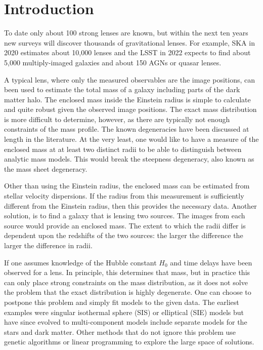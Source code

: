 \documentclass[onecolumn,galley]{mn2e}
\begin{document}
\section{Introduction}

To date only about 100 strong lenses are known, but within the next ten years
new surveys will discover thousands of gravitational lenses. For example, SKA
in 2020 estimates about 10,000 lenses and the LSST in 2022 expects to find
about 5,000 multiply-imaged galaxies and about 150 AGNs or quasar lenses.

A typical lens, where only the measured observables are the image positions,
can been used to estimate the total mass of a galaxy including parts of the
dark matter halo. The enclosed mass inside the Einstein radius is simple to
calculate and quite robust given the observed image positions. The exact mass
distribution is more difficult to determine, however, as there are typically
not enough constraints of the mass profile. The known degeneracies have been
discussed at length in the literature. At the very least, one would like to
have a measure of the enclosed mass at at least two distinct radii to be able
to distinguish between analytic mass models. This would break the steepness
degeneracy, also known as the mass sheet degeneracy.

Other than using the Einstein radius, the enclosed mass can be estimated
from stellar velocity dispersions. If the radius from this measurement
is sufficiently different from the Einstein radius, then this provides the
necessary data. Another solution, is to find a galaxy that is lensing two
sources. The images from each source would provide an enclosed mass. The
extent to which the radii differ is dependent upon the redshifts of the
two sources: the larger the difference the larger the difference in radii.

If one assumes knowledge of the Hubble constant $H_0$ and time delays have been
observed for a lens. In principle, this determines that mass, but in practice
this can only place strong constraints on the mass distribution, as it does not
solve the problem that the exact distribution is highly degenerate. One can
choose to postpone this problem and simply fit models to the given data.  The
earliest examples were singular isothermal sphere (SIS) or elliptical (SIE)
models but have since evolved to multi-component models include separate models
for the stars and dark matter. Other methods that do not ignore this problem
use genetic algorithms or linear programming to explore the large space of
solutions.
\end{document}
